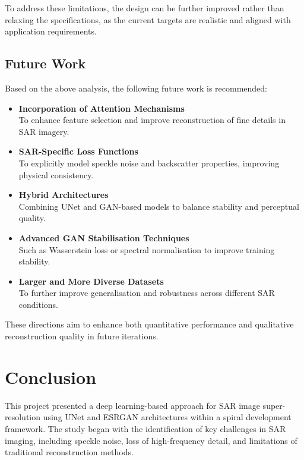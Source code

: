 \documentclass[conference]{IEEEtran}
\begin{document}
To address these limitations, the design can be further improved rather than relaxing the specifications, as the current targets are realistic and aligned with application requirements.

\subsection{Future Work}

Based on the above analysis, the following future work is recommended:

\begin{itemize}
    \item \textbf{Incorporation of Attention Mechanisms} \\
    To enhance feature selection and improve reconstruction of fine details in SAR imagery.

    \item \textbf{SAR-Specific Loss Functions} \\
    To explicitly model speckle noise and backscatter properties, improving physical consistency.

    \item \textbf{Hybrid Architectures} \\
    Combining UNet and GAN-based models to balance stability and perceptual quality.

    \item \textbf{Advanced GAN Stabilisation Techniques} \\
    Such as Wasserstein loss or spectral normalisation to improve training stability.

    \item \textbf{Larger and More Diverse Datasets} \\
    To further improve generalisation and robustness across different SAR conditions.
\end{itemize}

These directions aim to enhance both quantitative performance and qualitative reconstruction quality in future iterations.

\section{Conclusion}

This project presented a deep learning-based approach for SAR image super-resolution using UNet and ESRGAN architectures within a spiral development framework. The study began with the identification of key challenges in SAR imaging, including speckle noise, loss of high-frequency detail, and limitations of traditional reconstruction methods.
\end{document}
